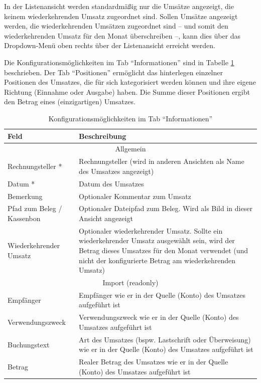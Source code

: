 In der Listenansicht werden standardmäßig nur die Umsätze angezeigt, die keinem wiederkehrenden Umsatz zugeordnet sind. Sollen Umsätze angezeigt werden, die wiederkehrenden Umsätzen zugeordnet sind -- und somit den wiederkehrenden Umsatz für den Monat überschreiben --, kann dies über das Dropdown-Menü oben rechts über der Listenansicht erreicht werden.

Die Konfigurationsmöglichkeiten im Tab "`Informationen"' sind in Tabelle \ref{tab:uniqueTurnoverInfoTab} beschrieben. Der Tab "`Positionen"' ermöglicht das hinterlegen einzelner Positionen des Umsatzes, die für sich kategorisiert werden können und ihre eigene Richtung (Einnahme oder Ausgabe) haben. Die Summe dieser Positionen ergibt den Betrag eines (einzigartigen) Umsatzes.

\renewcommand{\arraystretch}{1.5}
\begin{table}[!ht]
\centering
\begin{tabular}{|p{6cm}|p{8cm}|}
\hline 
\textbf{Feld} & \textbf{Beschreibung} \\ 
\hline 
\hline 
\multicolumn{2}{|c|}{Allgemein} \\ 
\hline 
Rechnungsteller * & Rechnungsteller (wird in anderen Ansichten als Name des Umsatzes angezeigt)  \\ 
\hline 
Datum * & Datum des Umsatzes \\ 
\hline 
Bemerkung & Optionaler Kommentar zum Umsatz \\ 
\hline 
Pfad zum Beleg / Kassenbon & Optionaler Dateipfad zum Beleg. Wird als Bild in dieser Ansicht angezeigt \\ 
\hline 
Wiederkehrender Umsatz & Optionaler wiederkehrender Umsatz. Sollte ein wiederkehrender Umsatz ausgewählt sein, wird der Betrag dieses Umsatzes für den Monat verwendet (und nicht der konfigurierte Betrag am wiederkehrenden Umsatz) \\ 
\hline 
\hline 
\multicolumn{2}{|c|}{Import (readonly)} \\ 
\hline 
Empfänger & Empfänger wie er in der Quelle (Konto) des Umsatzes aufgeführt ist \\
\hline
Verwendungszweck & Verwendungszweck wie er in der Quelle (Konto) des Umsatzes aufgeführt ist \\
\hline 
Buchungstext & Art des Umsatzes (bspw. Lastschrift oder Überweisung) wie er in der Quelle (Konto) des Umsatzes aufgeführt ist \\
\hline 
Betrag & Realer Betrag des Umsatzes wie er in der Quelle (Konto) des Umsatzes aufgeführt ist \\
\hline 
\end{tabular} 
\caption{Konfigurationsmöglichkeiten im Tab "`Informationen"'}
\label{tab:uniqueTurnoverInfoTab}
\end{table}
\renewcommand{\arraystretch}{1.0}

